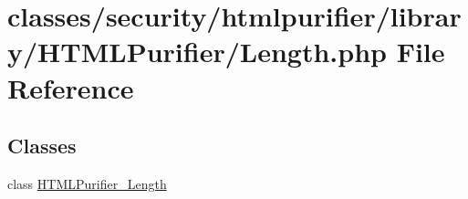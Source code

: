 \hypertarget{Length_8php}{\section{classes/security/htmlpurifier/library/\+H\+T\+M\+L\+Purifier/\+Length.php File Reference}
\label{Length_8php}
}
\subsection*{Classes}
\begin{DoxyCompactItemize}
\item 
class \hyperlink{classHTMLPurifier__Length}{H\+T\+M\+L\+Purifier\+\_\+\+Length}
\end{DoxyCompactItemize}
